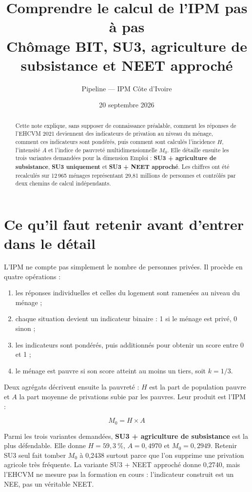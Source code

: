 \documentclass[11pt,a4paper]{article}
\title{\bfseries Comprendre le calcul de l'IPM pas à pas\\[5pt]
\large Chômage BIT, SU3, agriculture de subsistance et NEET approché}
\author{Pipeline \col{PythonIPM} --- IPM Côte d'Ivoire}
\date{20 septembre 2026}
\begin{document}
\maketitle

\begin{abstract}
\noindent Cette note explique, sans supposer de connaissance préalable, comment les réponses de
l'EHCVM 2021 deviennent des indicateurs de privation au niveau du ménage, comment ces indicateurs
sont pondérés, puis comment sont calculés l'incidence $H$, l'intensité $A$ et l'indice de pauvreté
multidimensionnelle $M_0$. Elle détaille ensuite les trois variantes demandées pour la dimension
Emploi : \textbf{SU3 + agriculture de subsistance}, \textbf{SU3 uniquement} et
\textbf{SU3 + NEET approché}. Les chiffres ont été recalculés sur 12\,965 ménages représentant
29,81 millions de personnes et contrôlés par deux chemins de calcul indépendants.
\end{abstract}

\tableofcontents
\newpage

\section{Ce qu'il faut retenir avant d'entrer dans le détail}

L'IPM ne compte pas simplement le nombre de personnes privées. Il procède en quatre opérations :

\begin{enumerate}
  \item les réponses individuelles et celles du logement sont ramenées au niveau du ménage ;
  \item chaque situation devient un indicateur binaire : 1 si le ménage est privé, 0 sinon ;
  \item les indicateurs sont pondérés, puis additionnés pour obtenir un score entre 0 et 1 ;
  \item le ménage est pauvre si son score atteint au moins un tiers, soit $k=1/3$.
\end{enumerate}

Deux agrégats décrivent ensuite la pauvreté : $H$ est la part de population pauvre et $A$ la part
moyenne de privations subie par les pauvres. Leur produit est l'IPM :

\[
  \boxed{M_0 = H \times A}
\]

\begin{retenir}
Parmi les trois variantes demandées, \textbf{SU3 + agriculture de subsistance} est la plus
défendable. Elle donne $H=59{,}3~\%$, $A=0{,}4970$ et $M_0=0{,}2949$. Retenir SU3 seul fait
tomber $M_0$ à 0,2438 surtout parce que l'on supprime une privation agricole très fréquente.
La variante SU3 + NEET approché donne 0,2740, mais l'EHCVM ne mesure pas la formation en cours :
l'indicateur construit est un NEE, pas un véritable NEET.
\end{retenir}
\end{document}
